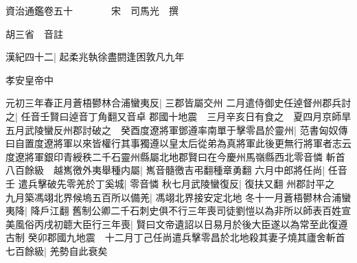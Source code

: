 






























































資治通鑑卷五十　　　　宋　司馬光　撰

胡三省　音註

漢紀四十二|{
	起柔兆執徐盡閼逢困敦凡九年}


孝安皇帝中

元初三年春正月蒼梧鬰林合浦蠻夷反|{
	三郡皆屬交州}
二月遣侍御史任逴督州郡兵討之|{
	任音壬賢曰逴音丁角翻又音卓}
郡國十地震　三月辛亥日有食之　夏四月京師旱五月武陵蠻反州郡討破之　癸酉度遼將軍鄧遵率南單于擊零昌於靈州|{
	范書匈奴傳曰自置度遼將軍以來皆權行其事獨遵以皇太后從弟為真將軍此後更無行將軍者志云度遼將軍銀印青綬秩二千石靈州縣屬北地郡賢曰在今慶州馬嶺縣西北零音憐}
斬首八百餘級　越嶲徼外夷舉種内屬|{
	嶲音髓徼吉弔翻種章勇翻}
六月中郎將任尚|{
	任音壬}
遣兵擊破先零羌於丁奚城|{
	零音憐}
秋七月武陵蠻復反|{
	復扶又翻}
州郡討平之　九月築馮翊北界候塢五百所以備羌|{
	馮翊北界接安定北地}
冬十一月蒼梧鬰林合浦蠻夷降|{
	降戶江翻}
舊制公卿二千石刺史俱不行三年喪司徒劉愷以為非所以師表百姓宣美風俗丙戌初聼大臣行三年喪|{
	賢曰文帝遺詔以日易月於後大臣遂以為常至此復遵古制}
癸卯郡國九地震　十二月丁己任尚遣兵擊零昌於北地殺其妻子燒其廬舍斬首七百餘級|{
	羌勢自此衰矣}


